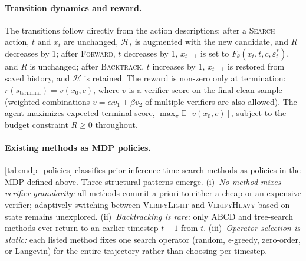 \paragraph{Transition dynamics and reward.}
The transitions follow directly from the action descriptions: after a \textsc{Search} action, $t$ and $x_t$ are unchanged, $\mathcal{H}_t$ is augmented with the new candidate, and $R$ decreases by 1; after \textsc{Forward}, $t$ decreases by 1, $x_{t-1}$ is set to $F_\theta(x_t,t,c,\varepsilon_t^*)$, and $R$ is unchanged; after \textsc{Backtrack}, $t$ increases by 1, $x_{t+1}$ is restored from saved history, and $\mathcal{H}$ is retained. The reward is non-zero only at termination: $r(s_{\text{terminal}})=v(x_0,c)$, where $v$ is a verifier score on the final clean sample (weighted combinations $v=\alpha v_1 + \beta v_2$ of multiple verifiers are also allowed). The agent maximizes expected terminal score, $\max_\pi \mathbb{E}[v(x_0,c)]$, subject to the budget constraint $R\ge 0$ throughout.

\paragraph{Existing methods as MDP policies.}
\cref{tab:mdp_policies} classifies prior inference-time-search methods as policies in the MDP defined above. Three structural patterns emerge. (i)~\emph{No method mixes verifier granularity:} all methods commit a priori to either a cheap or an expensive verifier; adaptively switching between \textsc{VerifyLight} and \textsc{VerifyHeavy} based on state remains unexplored. (ii)~\emph{Backtracking is rare:} only ABCD and tree-search methods ever return to an earlier timestep $t+1$ from $t$. (iii)~\emph{Operator selection is static:} each listed method fixes one search operator (random, $\epsilon$-greedy, zero-order, or Langevin) for the entire trajectory rather than choosing per timestep.

